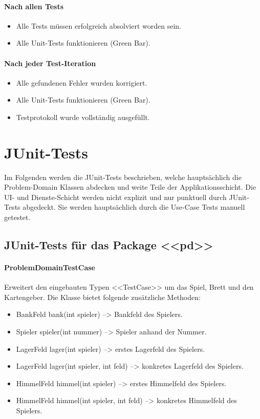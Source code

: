 \documentclass[12pt,halfparskip]{scrartcl}
\begin{document}
	\paragraph{Nach allen Tests}\label{ssub:nach_allen_tests} %
		\begin{itemize}
			\item Alle Tests müssen erfolgreich absolviert worden sein.
			\item Alle Unit-Tests funktionieren (Green Bar).
		\end{itemize}
	\paragraph{Nach jeder Test-Iteration}\label{ssub:nach_jeder_test_iteration} %
		\begin{itemize}
			\item Alle gefundenen Fehler wurden korrigiert.
			\item Alle Unit-Tests funktionieren (Green Bar).
			\item Testprotokoll wurde vollständig ausgefüllt.
		\end{itemize}

\section{JUnit-Tests}\label{sec:junit_tests} %
Im Folgenden werden die JUnit-Tests beschrieben, welche hauptsächlich die Problem-Domain Klassen abdecken und weite Teile der Applikationsschicht. Die UI- und Dienste-Schicht werden nicht explizit und nur punktuell durch JUnit-Tests abgedeckt. Sie werden hauptsächlich durch die Use-Case Tests manuell getestet.
\subsection{JUnit-Tests für das Package <<pd>>}\label{sub:junit_tests_für_das_package_pd_} %
	\paragraph{ProblemDomainTestCase}\label{ssub:problemdomaintestcase} %
	Erweitert den eingebauten Typen <<TestCase>> um das Spiel, Brett und den Kartengeber. Die Klasse bietet folgende zusätzliche Methoden:
	\begin{itemize}
		\item BankFeld bank(int spieler) --> Bankfeld des Spielers.
		\item Spieler spieler(int nummer) --> Spieler anhand der Nummer.
		\item LagerFeld lager(int spieler) --> erstes Lagerfeld des Spielers.
		\item LagerFeld lager(int spieler, int feld) --> konkretes Lagerfeld des Spielers.
		\item HimmelFeld himmel(int spieler) --> erstes Himmelfeld des Spielers.
		\item HimmelFeld himmel(int spieler, int feld) --> konkretes Himmelfeld des Spielers.
	\end{itemize}
\end{document}
